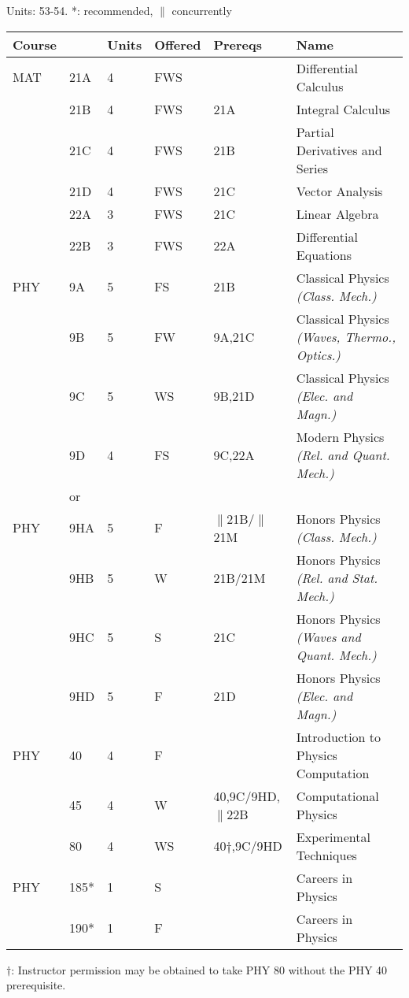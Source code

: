 \documentclass[12pt]{article}
\begin{document}
\vskip 2cm
\noindent
\vskip 0.25cm
Units:  53-54. *: recommended, $\parallel$ concurrently\\
\begin{tabular}{|llllll|}
\hline
Course & & Units & Offered & Prereqs & Name \\
\hline
MAT & 21A & 4 & FWS & & Differential Calculus\\ 
    & 21B & 4 & FWS & 21A & Integral Calculus \\ 
    & 21C & 4 & FWS & 21B & Partial Derivatives and Series\\ 
    & 21D & 4 & FWS & 21C & Vector Analysis\\ 
    & 22A & 3 & FWS & 21C & Linear Algebra\\ 
    & 22B & 3 & FWS & 22A & Differential Equations\\ 
\hline
\hline

PHY & 9A & 5 & FS & 21B & Classical Physics {\it (Class. Mech.)}\\ 
    & 9B & 5 & FW & 9A,21C & Classical Physics {\it (Waves, Thermo., Optics.)}\\ 
    & 9C & 5 & WS & 9B,21D & Classical Physics {\it (Elec. and Magn.)}\\ 
    & 9D & 4 & FS & 9C,22A & Modern Physics {\it (Rel. and Quant. Mech.)}\\ 
\hline
&or&&\\
\hline
PHY & 9HA & 5 & F & $\parallel$21B/$\parallel$21M & Honors Physics {\it (Class. Mech.)}\\ 
    & 9HB & 5 & W & 21B/21M & Honors Physics {\it (Rel. and Stat. Mech.)}\\ 
    & 9HC & 5 & S & 21C & Honors Physics {\it (Waves and Quant. Mech.)}\\ 
    & 9HD & 5 & F & 21D & Honors Physics {\it (Elec. and Magn.)}\\ 
\hline
\hline
PHY & 40  & 4 & F & & Introduction to Physics Computation \\ 
    & 45  & 4 & W & 40,9C/9HD,$\parallel$22B & Computational Physics\\ 
    & 80  & 4 & WS & 40$\dagger$,9C/9HD     & Experimental Techniques \\
PHY & 185* & 1 & S & & Careers in Physics \\ 
    & 190* & 1 & F & & Careers in Physics \\ 
\hline
\end{tabular}
$\dagger$:  Instructor permission may be obtained to take PHY 80 without the PHY 40 prerequisite.
\end{document}
